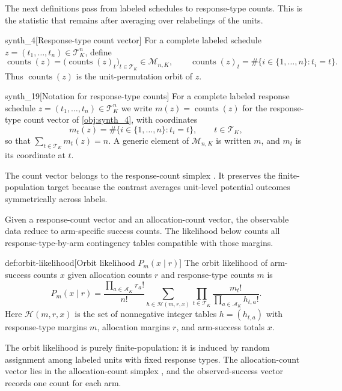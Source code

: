 The next definitions pass from labeled schedules to response-type counts. This is the statistic that remains after averaging over relabelings of the units.

\begin{definitionv}{synth_4}[Response-type count vector]
For a complete labeled schedule \(z=(t_1,\ldots,t_n)\in\mathcal T_K^n\), define
\[
\operatorname{counts}(z)=\bigl(\operatorname{counts}(z)_t\bigr)_{t\in\mathcal T_K}\in\mathcal M_{n,K},
\qquad
\operatorname{counts}(z)_t=\#\{i\in\{1,\ldots,n\}:t_i=t\}.
\]
Thus \(\operatorname{counts}(z)\) is the unit-permutation orbit of \(z\).
\end{definitionv}

\begin{definitionv}{synth_19}[Notation for response-type counts]
For a complete labeled response schedule \(z=(t_1,\ldots,t_n)\in\mathcal T_K^n\) we write \(m(z)=\operatorname{counts}(z)\) for the response-type count vector of \cref{obj:synth_4}, with coordinates
\[
m_t(z)=\#\{i\in\{1,\ldots,n\}:t_i=t\},\qquad t\in\mathcal T_K,
\]
so that \(\sum_{t\in\mathcal T_K}m_t(z)=n\). A generic element of \(\mathcal M_{n,K}\) is written \(m\), and \(m_t\) is its coordinate at \(t\).
\end{definitionv}

The count vector  belongs to the response-count simplex . It preserves the finite-population target because the contrast averages unit-level potential outcomes symmetrically across labels.

Given a response-count vector and an allocation-count vector, the observable data reduce to arm-specific success counts. The likelihood below counts all response-type-by-arm contingency tables compatible with those margins.

\begin{definitionv}{def:orbit-likelihood}[Orbit likelihood $P_m(x\mid r)$]
The orbit likelihood of arm-success counts \(x\) given allocation counts \(r\) and response-type counts \(m\) is
\[
P_m(x\mid r)=\frac{\prod_{a\in\mathcal A_K}r_a!}{n!}\sum_{h\in\mathcal H(m,r,x)}\prod_{t\in\mathcal T_K}\frac{m_t!}{\prod_{a\in\mathcal A_K}h_{t,a}!}.
\]
Here \(\mathcal H(m,r,x)\) is the set of nonnegative integer tables \(h=(h_{t,a})\) with response-type margins \(m\), allocation margins \(r\), and arm-success totals \(x\).
\end{definitionv}

The orbit likelihood  is purely finite-population: it is induced by random assignment among labeled units with fixed response types. The allocation-count vector  lies in the allocation-count simplex , and the observed-success vector  records one count for each arm.

